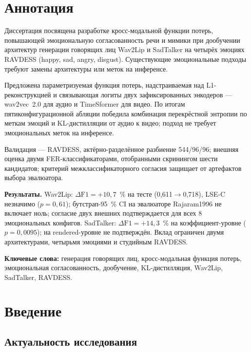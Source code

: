 \documentclass[a4paper, 12pt, oneside, openany]{article}
\begin{document}
\newpage
\setcounter{page}{2}
\section{Аннотация}

Диссертация посвящена разработке кросс-модальной функции потерь, повышающей эмоциональную согласованность речи и мимики при дообучении архитектур генерации говорящих лиц Wav2Lip и SadTalker на четырёх эмоциях RAVDESS (happy, sad, angry, disgust). Существующие эмоциональные подходы требуют замены архитектуры или меток на инференсе.

Предложена параметризуемая функция потерь, надстраиваемая над L1-реконструкцией и связывающая логиты двух зафиксированных энкодеров --- wav2vec~2.0 для аудио и TimeSformer для видео. По итогам пятиконфигурационной абляции победила комбинация перекрёстной энтропии по меткам эмоций и KL-дистилляции от аудио к видео; подход не требует эмоциональных меток на инференсе.

Валидация --- RAVDESS, актёрно-разделённое разбиение 544/96/96; внешняя оценка двумя FER-классификаторами, отобранными скринингом шести кандидатов; критерий межклассификаторного согласия защищает от артефактов выбора эвалюатора.

\textbf{Результаты.} Wav2Lip: $\Delta\text{F1}=+10{,}7$~\% на тесте (0,611$\to$0,718), LSE-C незначимо ($p=0{,}61$); бутстрап-95~\% CI на эвалюаторе Rajaram1996 не включает ноль; согласие двух внешних подтверждается для всех 8 эмоциональных конфигов. SadTalker: $\Delta\text{F1}=+14{,}3$~\% на коэффициент-уровне ($p=0{,}0095$); на rendered-уровне не подтверждён. Вклад ограничен двумя архитектурами, четырьмя эмоциями и студийным RAVDESS.

\textbf{Ключевые слова:} генерация говорящих лиц, кросс-модальная функция потерь, эмоциональная согласованность, дообучение, KL-дистилляция, Wav2Lip, SadTalker, RAVDESS.

\newpage
\tableofcontents  %
\suppressfloats
\newpage

\section{Введение}

\subsection{Актуальность исследования}
\end{document}
